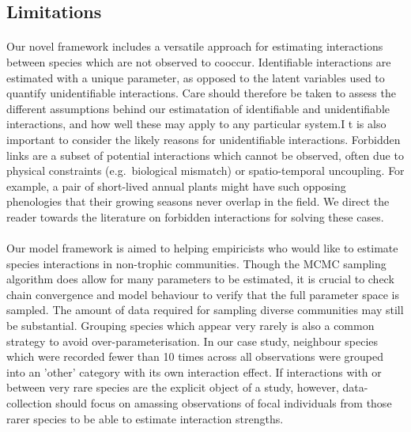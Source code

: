 \documentclass[a4,12pt]{article}
\begin{document}
   \subsection{Limitations}


    \paragraph{}
    Our novel framework includes a versatile approach for estimating interactions between species which are not observed to cooccur. Identifiable interactions are estimated with a unique parameter, as opposed to the latent variables used to quantify unidentifiable interactions. Care should therefore be taken to assess the different assumptions behind our estimatation of identifiable and unidentifiable interactions, and how well these may apply to any particular system.I t is also important to consider the likely reasons for unidentifiable interactions. Forbidden links are a subset of potential interactions which cannot be observed, often due to physical constraints (e.g.\ biological mismatch) or spatio-temporal uncoupling. For example, a pair of short-lived annual plants might have such opposing phenologies that their growing seasons never overlap in the field. We direct the reader towards the literature on forbidden interactions \parencite{Olesen2011, Jordano2016} for solving these cases. 


    \paragraph{}
    Our model framework is aimed to helping empiricists who would like to estimate species interactions in non-trophic communities. Though the MCMC sampling algorithm does allow for many parameters to be estimated, it is crucial to check chain convergence and model behaviour to verify that the full parameter space is sampled. The amount of data required for sampling diverse communities may still be substantial. Grouping species which appear very rarely is also a common strategy to avoid over-parameterisation. In our case study, neighbour species which were recorded fewer than 10 times across all observations were grouped into an 'other' category with its own interaction effect. If interactions with or between very rare species are the explicit object of a study, however, data-collection should focus on amassing observations of focal individuals from those rarer species to be able to estimate  interaction strengths.   
\end{document}
